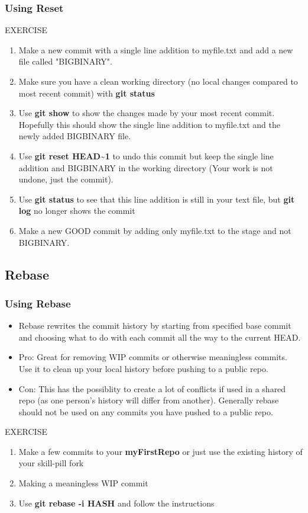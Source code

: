 \documentclass{beamer}
\begin{document}
\begin{frame}[fragile]
	\frametitle{Using Reset}
	\begin{block}{EXERCISE}
		\begin{enumerate}
			\item Make a new commit with a single line addition to myfile.txt and add a new file called "BIGBINARY". 
			\item Make sure you have a clean working directory (no local changes compared to most recent commit) with \textbf{git status}
			\item Use \textbf{git show} to show the changes made by your most recent commit. Hopefully this should show the single line addition to myfile.txt and the newly added BIGBINARY file.
			\item Use \textbf{git reset HEAD\textasciitilde1} to undo this commit but keep the single line addition and BIGBINARY in the working directory (Your work is not undone, just the commit).
			\item Use \textbf{git status} to see that this line addition is still in your text file, but \textbf{git log} no longer shows the commit
			\item Make a new GOOD commit by adding only myfile.txt to the stage and not BIGBINARY.
		\end{enumerate}
	\end{block}
\end{frame}

\subsection{Rebase}

\begin{frame}[fragile]
	\frametitle{Using Rebase}
	\begin{itemize}
		\item Rebase rewrites the commit history by starting from specified base commit and choosing what to do with each commit all the way to the current HEAD.
		\item Pro: Great for removing WIP commits or otherwise meaningless commits. Use it to clean up your local history before pushing to a public repo.
		\item Con: This has the possiblity to create a lot of conflicts if used in a shared repo (as one person's history will differ from another). Generally rebase should not be used on any commits you have pushed to a public repo. 
	\end{itemize}
	\begin{block}{EXERCISE}
		\begin{enumerate}
			\item Make a few commits to your \textbf{myFirstRepo} or just use the existing history of your skill-pill fork
			\item Making a meaningless WIP commit
			\item Use \textbf{git rebase -i \textlangle{}HASH\textrangle{}} and follow the instructions
		\end{enumerate}
	\end{block}
\end{frame}
\end{document}

